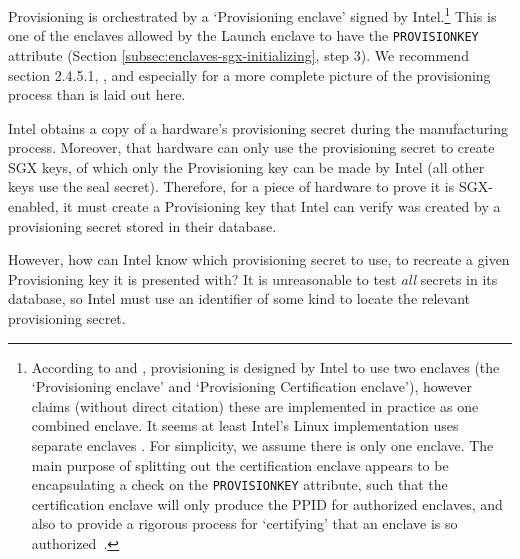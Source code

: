 
Provisioning is orchestrated by a `Provisioning enclave' signed by Intel.\footnote{According to \cite{sgx-extending-sgx-autonomy-and-anonymity-thesis} and \cite{sgx-remote-attestation-is-not-sufficient}, provisioning is designed by Intel to use two enclaves (the `Provisioning enclave' and `Provisioning Certification enclave'), however \cite{sgx-overview-part-2-externals-quarkslab} claims (without direct citation) these are implemented in practice as one combined enclave. It seems at least Intel's Linux implementation uses separate enclaves \cite{intel-lib-linux-sgx}. For simplicity, we assume there is only one enclave. The main purpose of splitting out the certification enclave appears to be encapsulating a check on the {\tt PROVISIONKEY} attribute, such that the certification enclave will only produce the PPID for authorized enclaves, and also to provide a rigorous process for `certifying' that an enclave is so authorized~\cite{intel-lib-linux-sgx}.} This is one of the enclaves allowed by the Launch enclave to have the {\tt PROVISIONKEY} attribute (Section \ref{subsec:enclaves-sgx-initializing}, step 3). We recommend \cite{sgx-extending-sgx-autonomy-and-anonymity-thesis} section 2.4.5.1, \cite{sgx-remote-attestation-is-not-sufficient}, and especially \cite{intel-lib-linux-sgx} for a more complete picture of the provisioning process than is laid out here.%

Intel obtains a copy of a hardware's provisioning secret during the manufacturing process. Moreover, that hardware can only use the provisioning secret to create SGX keys, of which only the Provisioning key can be made by Intel (all other keys use the seal secret). Therefore, for a piece of hardware to prove it is SGX-enabled, it must create a Provisioning key that Intel can verify was created by a provisioning secret stored in their database.

However, how can Intel know which provisioning secret to use, to recreate a given Provisioning key it is presented with? It is unreasonable to test {\em all} secrets in its database, so Intel must use an identifier of some kind to locate the relevant provisioning secret.

